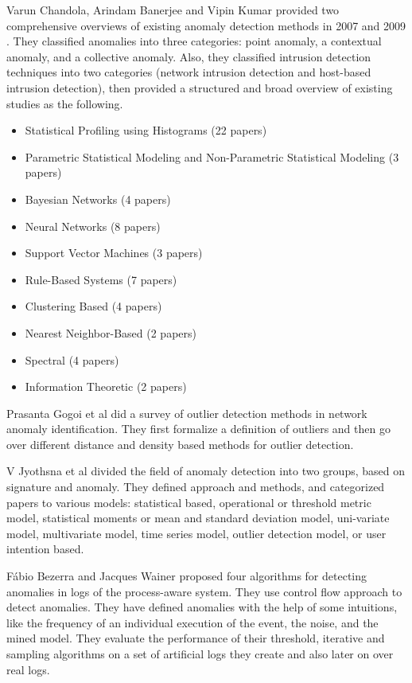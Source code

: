 \documentclass [11pt]{article}
\begin{document}
Varun Chandola, Arindam Banerjee and Vipin Kumar provided two comprehensive overviews of existing anomaly detection methods in 2007 \cite{chandola2007} and 2009 \cite{chandola2009anomaly}. They classified anomalies into three categories: point anomaly, a contextual anomaly, and a collective anomaly. Also, they classified intrusion detection techniques into two categories (network intrusion detection and host-based intrusion detection), then provided a structured and broad overview of existing studies as the following. 
\begin{itemize}
\item Statistical Profiling using Histograms (22 papers)
\item Parametric Statistical Modeling and Non-Parametric Statistical Modeling (3 papers)
\item Bayesian Networks (4 papers)
\item Neural Networks (8 papers)
\item Support Vector Machines (3 papers)
\item Rule-Based Systems (7 papers)
\item Clustering Based (4 papers)
\item Nearest Neighbor-Based (2 papers)
\item Spectral (4 papers)
\item Information Theoretic (2 papers)
\end{itemize}

Prasanta Gogoi et al \cite{Gogoi2011} did a survey of outlier detection
methods in network anomaly identification. They first formalize a definition of outliers and then go over different distance and density based methods for outlier detection.

V Jyothsna et al \cite{Jyothsna2011} divided the field of anomaly detection into two groups, based on signature and anomaly. They defined approach and methods, and categorized papers to various models: statistical based, operational or threshold metric model, statistical moments or mean and standard deviation model, uni-variate model, multivariate model, time series model, outlier detection model, or user intention based.

F\'{a}bio Bezerra and Jacques Wainer \cite{Bezerra2013} proposed four algorithms for detecting anomalies in logs of the process-aware system. They use control flow approach to detect anomalies. They have defined anomalies with the help of some intuitions, like the frequency of an individual execution of the event, the noise, and the mined model. They evaluate the performance of their threshold, iterative and sampling algorithms on a set of artificial logs they create and also later on over real logs.
\end{document}
